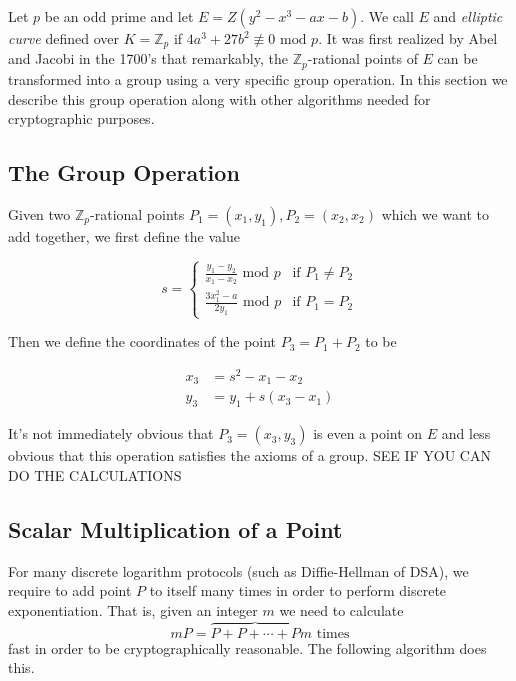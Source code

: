

Let $p$ be an odd prime and let $E = Z( y^2 - x^3 - ax - b)$. We call $E$ and \textit{elliptic curve} defined over $K = \mathbb{Z}_p$ if $4a^3 + 27b^2 \not\equiv 0 \text{ mod } p$. It was first realized by {\color{red}Abel and Jacobi in the 1700's} that remarkably, the $\mathbb{Z}_p$-rational points of $E$ can be transformed into a group using a very specific group operation. In this section we describe this group operation along with other algorithms needed for cryptographic purposes. 

\subsection{The Group Operation}  

Given two $\mathbb{Z}_p$-rational points $P_1 = (x_1,y_1),P_2=(x_2,x_2)$ which we want to add together, we first define the value 

$$ s =
\begin{cases}
\frac{y_1 - y_2}{x_1 - x_2} \text{ mod } p 	&\text{if } P_1 \neq P_2 \\
\frac{3x_1^2 - a}{2y_1} 	\text{ mod } p	&\text{if } P_1 = P_2 
\end{cases} 
$$ 

Then we define the coordinates of the point $P_3 = P_1 + P_2 $ to be 

\begin{align*}
	x_3 &= s^2 - x_1 - x_2  \\ 
	y_3 &= y_1 + s(x_3 - x_1) 
\end{align*}

It's not immediately obvious that $P_3 = (x_3,y_3)$ is even a point on $E$ and less obvious that this operation satisfies the axioms of a group. {\color{blue} SEE IF YOU CAN DO THE CALCULATIONS} 

\subsection{Scalar Multiplication of a Point}

For many discrete logarithm protocols (such as Diffie-Hellman of DSA), we require to add point $P$ to itself many times in order to perform discrete exponentiation. That is, given an integer $m$ we need to calculate $$mP = \overbrace{P + P + \cdots + P}{m \text{ times}}$$ fast in order to be cryptographically reasonable. The following algorithm does this.

